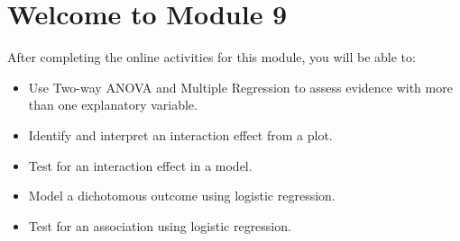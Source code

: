 \documentclass{article}
\begin{document}
\section*{Welcome to Module 9}

After completing the online activities for this module, you will be able to:

\begin{itemize}
    \item Use Two-way ANOVA and Multiple Regression to assess evidence with more than one explanatory variable.
    \item Identify and interpret an interaction effect from a plot.
    \item Test for an interaction effect in a model.
    \item Model a dichotomous outcome using logistic regression.
    \item Test for an association using logistic regression.
\end{itemize}
\end{document}
